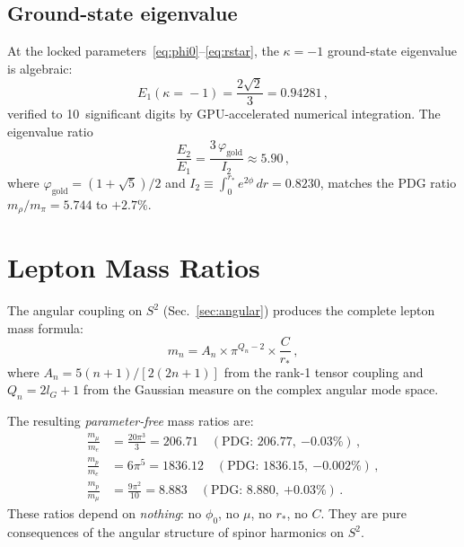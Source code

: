 \documentclass[aps,prd,twocolumn,superscriptaddress,nofootinbib,longbibliography]{revtex4-2}
\newcommand{\rstar}{r_{*}}
\newcommand{\phiz}{\phi_0}
\newcommand{\vgold}{\varphi_{\mathrm{gold}}}
\newcommand{\intdom}{\int_0^{\rstar}}
\begin{document}
\subsection{Ground-state eigenvalue}

At the locked parameters~\eqref{eq:phi0}--\eqref{eq:rstar}, the
$\kappa = -1$ ground-state eigenvalue is algebraic:
\begin{equation}\label{eq:E1}
  E_1(\kappa\!=\!-1) = \frac{2\sqrt{2}}{3} = 0.94281\,,
\end{equation}
verified to 10~significant digits by GPU-accelerated numerical
integration.  The eigenvalue ratio
\begin{equation}\label{eq:E2E1}
  \frac{E_2}{E_1} = \frac{3\,\vgold}{I_2} \approx 5.90\,,
\end{equation}
where $\vgold = (1+\sqrt{5})/2$ and
$I_2 \equiv \intdom e^{2\phi}\,dr = 0.8230$, matches the PDG ratio
$m_\rho/m_\pi = 5.744$ to $+2.7\%$.

\section{Lepton Mass Ratios}\label{sec:leptons}

The angular coupling on $S^2$ (Sec.~\ref{sec:angular}) produces the
complete lepton mass formula:
\begin{equation}\label{eq:lepton}
  m_n = A_n \times \pi^{Q_n - 2} \times \frac{C}{\rstar}\,,
\end{equation}
where $A_n = 5(n+1)/[2(2n+1)]$ from the rank-1 tensor coupling and
$Q_n = 2l_G + 1$ from the Gaussian measure on the complex angular
mode space.

The resulting \emph{parameter-free} mass ratios are:
\begin{align}
  \frac{m_\mu}{m_e} &= \frac{20\pi^3}{3} = 206.71
    \quad(\text{PDG: }206.77,\ {-0.03\%})\,, \label{eq:mu-e}\\
  \frac{m_p}{m_e} &= 6\pi^5 = 1836.12
    \quad(\text{PDG: }1836.15,\ {-0.002\%})\,, \label{eq:p-e}\\
  \frac{m_p}{m_\mu} &= \frac{9\pi^2}{10} = 8.883
    \quad(\text{PDG: }8.880,\ {+0.03\%})\,. \label{eq:p-mu}
\end{align}
These ratios depend on \emph{nothing}: no $\phiz$, no $\mu$, no
$\rstar$, no $C$.  They are pure consequences of the angular structure
of spinor harmonics on $S^2$.
\end{document}
